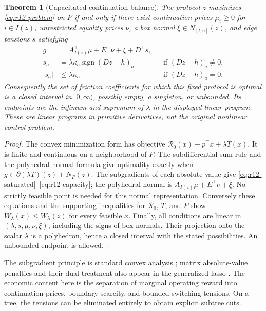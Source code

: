 \documentclass[11pt,letterpaper]{article}
\newtheorem{theorem}{Theorem}[section]
\theoremstyle{definition}
\newcommand{\1}{\mathbf 1}
\begin{document}
\begin{theorem}[Capacitated continuation balance]\label{thm:r12-balance}
The protocol $z$ maximizes \eqref{eq:r12-problem} on $P$ if and only if there exist continuation prices $\mu_i\geq0$ for $i\in I(z)$, unrestricted equality prices $\nu$, a box normal $\xi\in N_{[l,u]}(z)$, and edge tensions $s$ satisfying
\begin{align}
 g&=A_{I(z)}^\top\mu+E^\top\nu+\xi+D^\top s,\label{eq:r12-balance}\\
 s_a&=\lambda\kappa_a\operatorname{sign}(Dz-h)_a
                  &&\text{if }(Dz-h)_a\ne0,\label{eq:r12-saturated}\\
 |s_a|&\leq\lambda\kappa_a
                  &&\text{if }(Dz-h)_a=0.\label{eq:r12-capacity}
\end{align}
Consequently the set of friction coefficients for which this fixed protocol is optimal is a closed interval in $[0,\infty)$, possibly empty, a singleton, or unbounded. Its endpoints are the infimum and supremum of $\lambda$ in the displayed linear program. These are linear programs in primitive derivatives, not the original nonlinear control problem.
\end{theorem}
\begin{proof}
The convex minimization form has objective $\mathcal R_0(x)-p^\top x+\lambda T(x)$. It is finite and continuous on a neighborhood of $P$. The subdifferential sum rule and the polyhedral normal formula give optimality exactly when
$g\in\partial(\lambda T)(z)+N_P(z)$.
The subgradients of each absolute value give \eqref{eq:r12-saturated}--\eqref{eq:r12-capacity}; the polyhedral normal is $A_{I(z)}^\top\mu+E^\top\nu+\xi$. No strictly feasible point is needed for this normal representation. Conversely these equations and the supporting inequalities for $\mathcal R_0$, $T$, and $P$ show $W_\lambda(x)\leq W_\lambda(z)$ for every feasible $x$. Finally, all conditions are linear in $(\lambda,s,\mu,\nu,\xi)$, including the signs of box normals. Their projection onto the scalar $\lambda$ is a polyhedron, hence a closed interval with the stated possibilities. An unbounded endpoint is allowed.
\end{proof}
The subgradient principle is standard convex analysis \citep{BoydVandenberghe2004}; matrix absolute-value penalties and their dual treatment also appear in the generalized lasso \citep{TibshiraniTaylor2011}. The economic content here is the separation of marginal operating reward into continuation prices, boundary scarcity, and bounded switching tensions. On a tree, the tensions can be eliminated entirely to obtain explicit subtree cuts.
\end{document}
